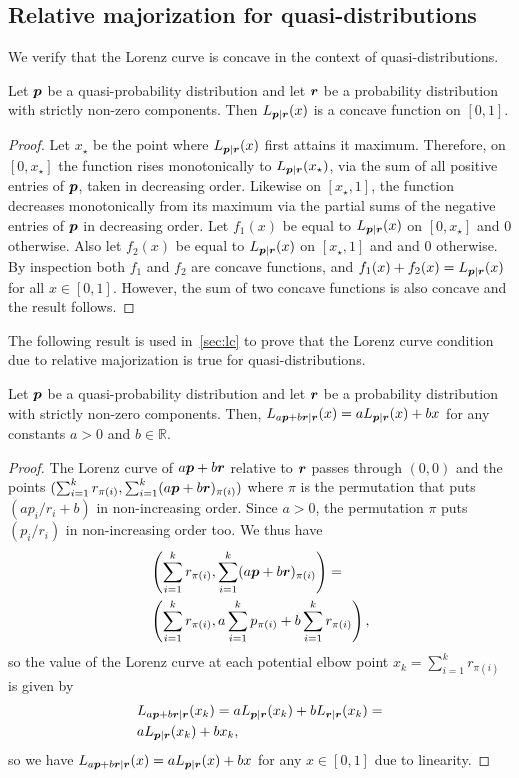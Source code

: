 \documentclass[pra,
aps,
twocolumn,
superscriptaddress,
groupedaddress,
nofootinbib,
reprint
]{revtex4-1}
\begin{document}
\subsection{Relative majorization for quasi-distributions}
\label{app:rel_quasi}

We verify that the Lorenz curve is concave in the context of quasi-distributions.
\begin{lemma}\label{L-concave} Let $\boldsymbol{p}$ be a quasi-probability distribution and let $\boldsymbol{r}$ be a probability distribution with strictly non-zero components. Then $L_{\boldsymbol{p}|\boldsymbol{r}}(x)$ is a concave function on $[0,1]$.
\end{lemma}
\begin{proof} 
Let $x_\star$ be the point where $L_{\boldsymbol{p}|\boldsymbol{r}}(x)$ first attains it maximum. Therefore, on $[0,x_\star]$ the function rises monotonically to $L_{\boldsymbol{p}|\boldsymbol{r}}(x_\star)$, via the sum of all positive entries of $\boldsymbol{p}$, taken in decreasing order. Likewise on $[x_\star, 1]$, the function decreases monotonically from its maximum via the partial sums of the negative entries of $\boldsymbol{p}$ in decreasing order. Let $f_1(x)$ be equal to $L_{\boldsymbol{p}|\boldsymbol{r}}(x)$ on $[0, x_\star]$ and $0$ otherwise. Also let $f_2(x)$ be equal to $L_{\boldsymbol{p}|\boldsymbol{r}}(x)$ on $[x_\star,1]$ and and $0$ otherwise. By inspection both $f_1$ and $f_2$ are concave functions, and $f_1(x) + f_2 (x) = L_{\boldsymbol{p}|\boldsymbol{r}}(x)$ for all $x\in [0,1]$. However, the sum of two concave functions is also concave and the result follows.
\end{proof}


The following result is used in~\cref{sec:lc} to prove that the Lorenz curve condition due to relative majorization is true for quasi-distributions.
\begin{proposition}\label{lemma:Lorenz_linearity}
	Let $\boldsymbol{p}$ be a quasi-probability distribution and let $\boldsymbol{r}$ be a probability distribution with strictly non-zero components. 
	Then, $L_{a\boldsymbol{p} + b \boldsymbol{r} | \boldsymbol{r}} (x) = a L_{\boldsymbol{p} |\boldsymbol{r}}(x) + b x$ for any constants $a > 0$ and $b \in \mathbb{R}$.
\end{proposition}
\begin{proof} 
	The Lorenz curve of $a\boldsymbol{p} + b \boldsymbol{r}$ relative to $\boldsymbol{r}$ passes through $(0,0)$ and the points $(\sum_{i=1}^k{r_{\pi(i)}}, \sum_{i=1}^k(a \boldsymbol{p} + b \boldsymbol{r})_{\pi(i)})$ where $\pi$ is the permutation that puts $(a p_i/r_i + b)$ in non-increasing order. Since $a > 0$, the permutation $\pi$ puts  $(p_i/r_i)$ in non-increasing order too. We thus have
\begin{align*}
&\left( \sum_{i=1}^kr_{\pi(i)}, \sum_{i=1}^k(a \boldsymbol{p} + b \boldsymbol{r})_{\pi(i)} \right) = \\ 
&\left( \sum_{i=1}^k r_{\pi(i)},a \sum_{i=1}^k  p_{\pi(i)} + b\sum_{i=1}^k r_{\pi(i)} \right) \nonumber,
\end{align*}
so the value of the Lorenz curve at each potential elbow point $x_k = \sum_{i=1} ^kr_{\pi(i)}$ is given by
\begin{align}
&L_{a \boldsymbol{p} +b \boldsymbol{r}|\boldsymbol{r}} (x_k) = a L_{\boldsymbol{p}|\boldsymbol{r}} (x_k) + b L_{\boldsymbol{r}|\boldsymbol{r}}(x_k) = \nonumber\\
&a L_{\boldsymbol{p}|\boldsymbol{r}} (x_k) + b x_k,
\end{align}
so we have $L_{a\boldsymbol{p}  + b\boldsymbol{r}|\boldsymbol{r}} (x) = a L_{\boldsymbol{p} |\boldsymbol{r}}(x) + b x$ for any $x \in [0,1]$ due to linearity.
\end{proof}
\end{document}
